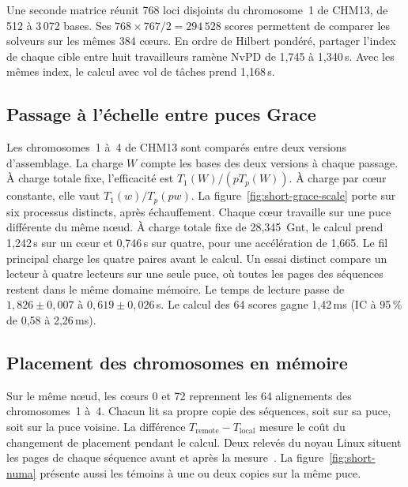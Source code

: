 Une seconde matrice réunit 768 loci disjoints du chromosome~1 de CHM13, de 512 à 3\,072 bases. Ses \(768\times767/2=294\,528\) scores permettent de comparer les solveurs sur les mêmes 384 cœurs. En ordre de Hilbert pondéré, partager l’index de chaque cible entre huit travailleurs ramène NvPD de 1,745 à 1,340\,s. Avec les mêmes index, le calcul avec vol de tâches prend 1,168\,s.


\subsection{Passage à l’échelle entre puces Grace}
Les chromosomes~1 à~4 de CHM13 sont comparés entre deux versions d’assemblage. La charge \(W\) compte les bases des deux versions à chaque passage. À charge totale fixe, l’efficacité est \(T_1(W)/(pT_p(W))\). À charge par cœur constante, elle vaut \(T_1(w)/T_p(pw)\). La figure~\ref{fig:short-grace-scale} porte sur six processus distincts, après échauffement. Chaque cœur travaille sur une puce différente du même nœud.
À charge totale fixe de 28,345~Gnt, le calcul prend 1,242\,s sur un cœur et 0,746\,s sur quatre, pour une accélération de 1,665. Le fil principal charge les quatre paires avant le calcul. Un essai distinct compare un lecteur à quatre lecteurs sur une seule puce, où toutes les pages des séquences restent dans le même domaine mémoire. Le temps de lecture passe de \(1{,}826\pm0{,}007\) à \(0{,}619\pm0{,}026\)\,s. Le calcul des 64 scores gagne 1,42\,ms (IC à 95\,\% de 0,58 à 2,26\,ms).

\subsection{Placement des chromosomes en mémoire}
Sur le même nœud, les cœurs 0 et 72 reprennent les 64 alignements des chromosomes~1 à~4. Chacun lit sa propre copie des séquences, soit sur sa puce, soit sur la puce voisine. La différence \(T_{\mathrm{remote}}-T_{\mathrm{local}}\) mesure le coût du changement de placement pendant le calcul. Deux relevés du noyau Linux situent les pages de chaque séquence avant et après la mesure~\cite{linuxnuma}. La figure~\ref{fig:short-numa} présente aussi les témoins à une ou deux copies sur la même puce.

